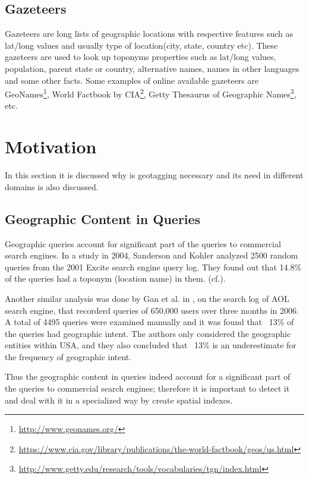 \documentclass[
     11pt,         %
     a4paper,      %
     oneside,
     ]{article}
\begin{document}
\subsection{Gazeteers} 
Gazeteers are long lists of geographic locations with respective features such as lat/long values and usually type of location(city, state, country etc). These gazeteers are used to look up toponyms properties such as lat/long values, population, parent state or country, alternative names, names in other languages and some other facts. Some examples of online available gazeteers are GeoNames\footnote{\url{http://www.geonames.org/}}, World Factbook by CIA\footnote{\url{https://www.cia.gov/library/publications/the-world-factbook/geos/us.html}}, Getty Thesaurus of Geographic Names\footnote{\url{http://www.getty.edu/research/tools/vocabularies/tgn/index.html}}, etc.

\section{Motivation}\label{sec:sections}
In this section it is discussed why is geotagging necessary and its need in different domains is also discussed.
\subsection{Geographic Content in Queries}
Geographic queries account for significant part of the queries to commercial search engines. In a study in 2004, Sanderson and Kohler analyzed 2500 random queries from the 2001 Excite search engine query log. They found out that 14.8\% of the queries had a toponym (location name) in them. \cite{Sanderson04analyzinggeographic}  (cf.\cite{Leidner:2008:PhD}).

Another similar analysis was done by Gan et al. in \cite{Gan:2008:AGQ:1367798.1367806}, on the search log of AOL search engine, that recorderd queries of 650,000 users over three months in 2006. A total of 4495 queries were examined manually and it was found that ~13\% of the queries had geographic intent. The authors only considered the geographic entities within USA, and they also concluded that ~13\% is an underestimate for the frequency of geographic intent. 

Thus the geographic content in queries indeed account for a significant part of the queries to commercial search engines; therefore it is important to detect it and deal with it in a specialized way by create spatial indexes.
\end{document}

